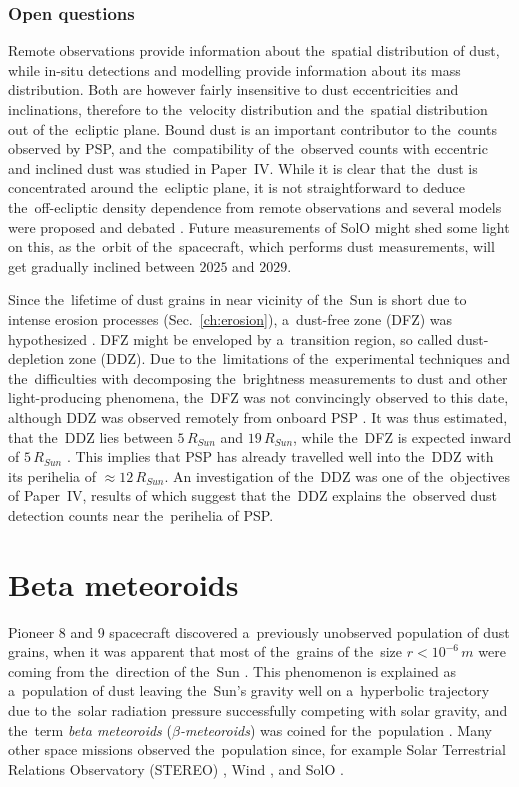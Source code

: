 \subsubsection{Open questions}

Remote observations provide information about the~spatial distribution of dust, while in-situ detections and modelling provide information about its mass distribution. Both are however fairly insensitive to dust eccentricities and inclinations, therefore to the~velocity distribution and the~spatial distribution out of the~ecliptic plane. Bound dust is an important contributor to the~counts observed by PSP, and the~compatibility of the~observed counts with eccentric and inclined dust was studied in Paper~IV. While it is clear that the~dust is concentrated around the~ecliptic plane, it is not straightforward to deduce the~off-ecliptic density dependence from remote observations and several models were proposed and debated \citep{giese1986three}. Future measurements of SolO might shed some light on this, as the~orbit of the~spacecraft, which performs dust measurements, will get gradually inclined between $2025$ and $2029$.

Since the~lifetime of dust grains in near vicinity of the~Sun is short due to intense erosion processes (Sec.~\ref{ch:erosion}), a~dust-free zone (DFZ) was hypothesized \citep{russell1929meteoric}. DFZ might be enveloped by a~transition region, so called dust-depletion zone (DDZ). Due to the~limitations of the~experimental techniques and the~difficulties with decomposing the~brightness measurements to dust and other light-producing phenomena, the~DFZ was not convincingly observed to this date, although DDZ was observed remotely from onboard PSP \citep{stenborg2018characterization}. It was thus estimated, that the~DDZ lies between $5 \, R_{Sun}$ and $19 \, R_{Sun}$, while the~DFZ is expected inward of $5 \, R_{Sun}$ \citep{stenborg2022psp}. This implies that PSP has already travelled well into the~DDZ with its perihelia of $\approx 12 \, R_{Sun}$. An investigation of the~DDZ was one of the~objectives of Paper~IV, results of which suggest that the~DDZ explains the~observed dust detection counts near the~perihelia of PSP.

\section{Beta meteoroids}

Pioneer 8 and 9 spacecraft discovered a~previously unobserved population of dust grains, when it was apparent that most of the~grains of the~size $r < 10^{-6} \, \si{m}$ were coming from the~direction of the~Sun \citep{berg1973evidence}. This phenomenon is explained as a~population of dust leaving the~Sun's gravity well on a~hyperbolic trajectory due to the~solar radiation pressure successfully competing with solar gravity, and the~term \textit{beta meteoroids} ($\beta$\textit{-meteoroids}) was coined for the~population \citep{zook1975source}. Many other space missions observed the~population since, for example Solar Terrestrial Relations Observatory ({STEREO}) \citep{zaslavsky2012interplanetary}, Wind \citep{malaspina2014interplanetary}, and SolO \cite{zaslavsky2021first}.

